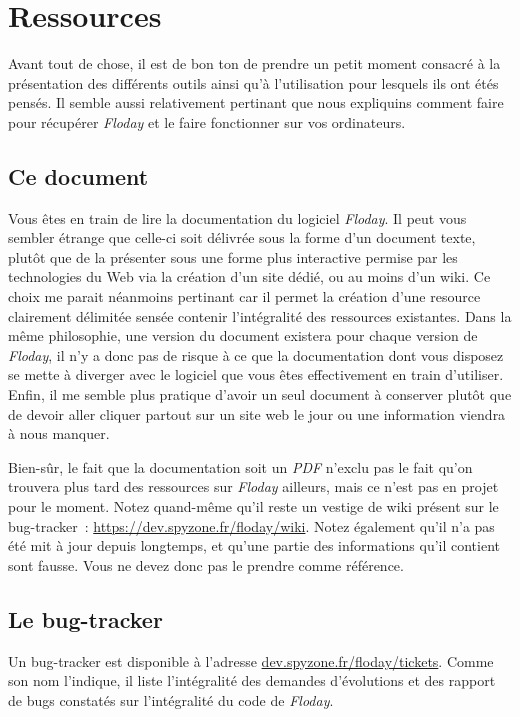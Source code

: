 \section{Ressources}
\begin{intro}
Avant tout de chose, il est de bon ton de prendre un petit moment consacré à la présentation des différents outils ainsi qu'à l'utilisation pour lesquels ils ont étés pensés.
Il semble aussi relativement pertinant que nous expliquins comment faire pour récupérer \emph{Floday} et le faire fonctionner sur vos ordinateurs.
\end{intro}

\subsection{Ce document}
Vous êtes en train de lire la documentation du logiciel \emph{Floday}.
Il peut vous sembler étrange que celle-ci soit délivrée sous la forme d'un document texte, plutôt que de la présenter sous une forme plus interactive permise par les technologies du Web via la création d'un site dédié, ou au moins d'un wiki.
Ce choix me parait néanmoins pertinant car il permet la création d'une resource clairement délimitée sensée contenir l'intégralité des ressources existantes.
Dans la même philosophie, une version du document existera pour chaque version de \emph{Floday}, il n'y a donc pas de risque à ce que la documentation dont vous disposez se mette à diverger avec le logiciel que vous êtes effectivement en train d'utiliser.
Enfin, il me semble plus pratique d'avoir un seul document à conserver plutôt que de devoir aller cliquer partout sur un site web le jour ou une information viendra à nous manquer.

Bien-sûr, le fait que la documentation soit un \emph{PDF} n'exclu pas le fait qu'on trouvera plus tard des ressources sur \emph{Floday} ailleurs, mais ce n'est pas en projet pour le moment.
Notez quand-même qu'il reste un vestige de wiki présent sur le bug-tracker~: \url{https://dev.spyzone.fr/floday/wiki}.
Notez également qu'il n'a pas été mit à jour depuis longtemps, et qu'une partie des informations qu'il contient sont fausse.
Vous ne devez donc pas le prendre comme référence.

\subsection{Le bug-tracker}
Un bug-tracker est disponible à l'adresse \url{dev.spyzone.fr/floday/tickets}.
Comme son nom l'indique, il liste l'intégralité des demandes d'évolutions et des rapport de bugs constatés sur l'intégralité du code de \emph{Floday}.

